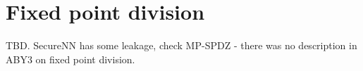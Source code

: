 \section{Fixed point division}
TBD. SecureNN has some leakage, check MP-SPDZ - there was no description in
ABY3 on fixed point division.
